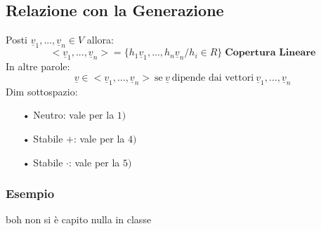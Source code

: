 \begin{itemize}
\subsection{Relazione con la Generazione}
Posti $\underline{v}_1,...,\underline{v}_n \in V$ allora:
$$ <\underline{v}_1,...,\underline{v}_n> = \{h_1\underline{v}_1,...,h_n\underline{v}_n / h_i \in R \} \; \textbf{Copertura Lineare}$$
In altre parole:
$$ \underline{v} \in <\underline{v}_1,...,\underline{v}_n> \:\text{se}\: \underline{v} \: \text{dipende dai vettori} \: \underline{v}_1,...,\underline{v}_n  $$
Dim sottospazio:
\begin{itemize}
\item[•] Neutro: vale per la $1)$ 
\item[•] Stabile $+$: vale per la $4)$
\item[•] Stabile $\cdot$: vale per la $5)$
\end{itemize}

\subsubsection{Esempio}
boh non si è capito nulla in classe


\end{itemize}







